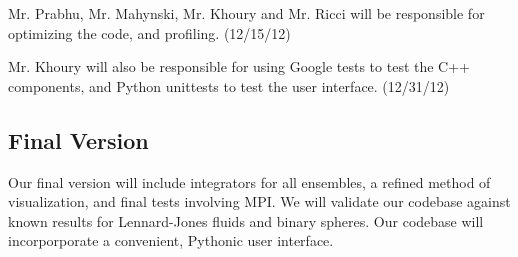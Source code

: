 \documentclass[10pt]{article}
\begin{document}
Mr. Prabhu, Mr. Mahynski, Mr. Khoury and Mr. Ricci will  be responsible for optimizing the code, and profiling. (12/15/12)

Mr. Khoury will also be responsible for using Google tests to test the C++ components, and Python unittests to test the user interface. (12/31/12)

\subsection{Final Version}
Our final version will include integrators for all ensembles, a refined method of visualization, and final tests involving MPI.  We will validate our codebase against known results for Lennard-Jones fluids and binary spheres.  Our codebase will incorporporate a convenient, Pythonic user interface.
\end{document}
